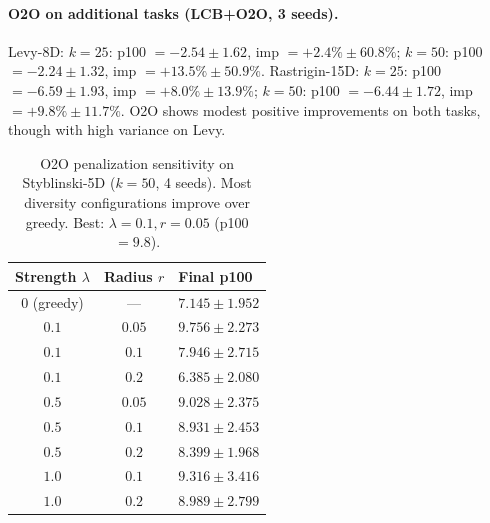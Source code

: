 \documentclass{article}
\theoremstyle{plain}
\theoremstyle{remark}
\begin{document}
\paragraph{O2O on additional tasks (LCB+O2O, 3 seeds).}
Levy-8D: $k{=}25$: p100 $= -2.54 \pm 1.62$, imp $= +2.4\% \pm 60.8\%$; $k{=}50$: p100 $= -2.24 \pm 1.32$, imp $= +13.5\% \pm 50.9\%$.
Rastrigin-15D: $k{=}25$: p100 $= -6.59 \pm 1.93$, imp $= +8.0\% \pm 13.9\%$; $k{=}50$: p100 $= -6.44 \pm 1.72$, imp $= +9.8\% \pm 11.7\%$.
O2O shows modest positive improvements on both tasks, though with high variance on Levy.

\begin{table}[h]
  \caption{O2O penalization sensitivity on Styblinski-5D ($k{=}50$, 4 seeds). Most diversity configurations improve over greedy. Best: $\lambda{=}0.1, r{=}0.05$ (p100 $= 9.8$).}
  \label{tab:pen_sens}
  \begin{center}
    \begin{small}
      \begin{tabular}{ccl}
        \toprule
        Strength $\lambda$ & Radius $r$ & Final p100 \\
        \midrule
        0 (greedy)  & ---  & $7.145 \pm 1.952$ \\
        $\mathbf{0.1}$ & $\mathbf{0.05}$ & $\mathbf{9.756 \pm 2.273}$ \\
        $0.1$ & $0.1$  & $7.946 \pm 2.715$ \\
        $0.1$ & $0.2$  & $6.385 \pm 2.080$ \\
        $0.5$ & $0.05$ & $9.028 \pm 2.375$ \\
        $0.5$ & $0.1$  & $8.931 \pm 2.453$ \\
        $0.5$ & $0.2$  & $8.399 \pm 1.968$ \\
        $1.0$ & $0.1$  & $9.316 \pm 3.416$ \\
        $1.0$ & $0.2$  & $8.989 \pm 2.799$ \\
        \bottomrule
      \end{tabular}
    \end{small}
  \end{center}
\end{table}
\end{document}
